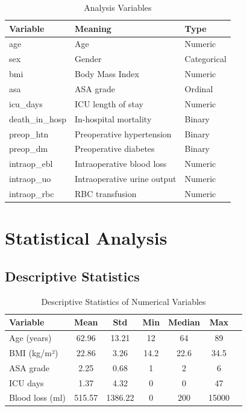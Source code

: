 \documentclass[12pt,a4paper]{article}
\begin{document}
\begin{table}[H]
\centering
\caption{Analysis Variables}
\begin{tabular}{lll}
\toprule
\textbf{Variable} & \textbf{Meaning} & \textbf{Type} \\
\midrule
age & Age & Numeric \\
sex & Gender & Categorical \\
bmi & Body Mass Index & Numeric \\
asa & ASA grade & Ordinal \\
icu\_days & ICU length of stay & Numeric \\
death\_in\_hosp & In-hospital mortality & Binary \\
preop\_htn & Preoperative hypertension & Binary \\
preop\_dm & Preoperative diabetes & Binary \\
intraop\_ebl & Intraoperative blood loss & Numeric \\
intraop\_uo & Intraoperative urine output & Numeric \\
intraop\_rbc & RBC transfusion & Numeric \\
\bottomrule
\end{tabular}
\end{table}

\section{Statistical Analysis}

\subsection{Descriptive Statistics}
\begin{table}[H]
\centering
\caption{Descriptive Statistics of Numerical Variables}
\begin{tabular}{lcccccc}
\toprule
\textbf{Variable} & \textbf{Mean} & \textbf{Std} & \textbf{Min} & \textbf{Median} & \textbf{Max} \\
\midrule
Age (years) & 62.96 & 13.21 & 12 & 64 & 89 \\
BMI (kg/m²) & 22.86 & 3.26 & 14.2 & 22.6 & 34.5 \\
ASA grade & 2.25 & 0.68 & 1 & 2 & 6 \\
ICU days & 1.37 & 4.32 & 0 & 0 & 47 \\
Blood loss (ml) & 515.57 & 1386.22 & 0 & 200 & 15000 \\
\bottomrule
\end{tabular}
\end{table}
\end{document}
